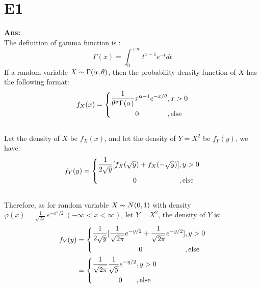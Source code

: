 \documentclass[twoside]{homework}
\begin{document}
\newpage

\section*{E1}
\textbf{Ans:}\\
The definition of gamma function is :
$$\Gamma(x) = \int_{0}^{+\infty} t^{x-1} e^{-t} dt $$
If a random variable $X \thicksim \Gamma(\alpha, \theta) $, then the probability density function of $X$ has the following format:\\
\begin{equation}
    \centering
    f_X (x)=
    \left\{  
             \begin{aligned}
             \frac{1}{\theta^\alpha \Gamma(\alpha)}x^{\alpha-1}e^{-x/\theta}&, x > 0 \\
             0\qquad\qquad&, \mathrm{else}
             \end{aligned}
    \right. 
\end{equation}{}\\
Let the density of $X$ be $f_X (x)$, and let the density of $Y=X^2$ be $f_Y (y)$, we have:\\
\begin{equation}
    \centering
    f_Y (y)=
    \left\{  
             \begin{aligned}
             \frac{1}{2\sqrt{y}}[f_X(\sqrt{y}) + f_X(-\sqrt{y})]&, y > 0 \\
             0\qquad\qquad\qquad&, \mathrm{else}
             \end{aligned}
    \right. 
\end{equation}{}\\
Therefore, as for random variable $X \thicksim N(0,1)$ with density $\varphi (x)=\frac{1}{\sqrt{2\pi}}e^{-x^2/2}\ (-\infty<x<\infty)$, let $Y=X^2$, the density of $Y$ is:
\begin{equation}
    \centering
    \begin{aligned}
    f_Y (y)&=
    \left\{  
             \begin{aligned}
             \frac{1}{2\sqrt{y}}[\frac{1}{\sqrt{2\pi}}e^{-y/2} + \frac{1}{\sqrt{2\pi}}e^{-y/2}]&, y > 0 \\
             0\qquad\qquad\qquad&, \mathrm{else}
             \end{aligned}
    \right. \\
    &=
    \left\{  
             \begin{aligned}
             \frac{1}{\sqrt{2\pi}}\frac{1}{\sqrt{y}} e^{-y/2}&, y > 0 \\
             0\qquad&, \mathrm{else}
             \end{aligned}
    \right. \\
    \end{aligned}
\end{equation}{}\\
\end{document}
